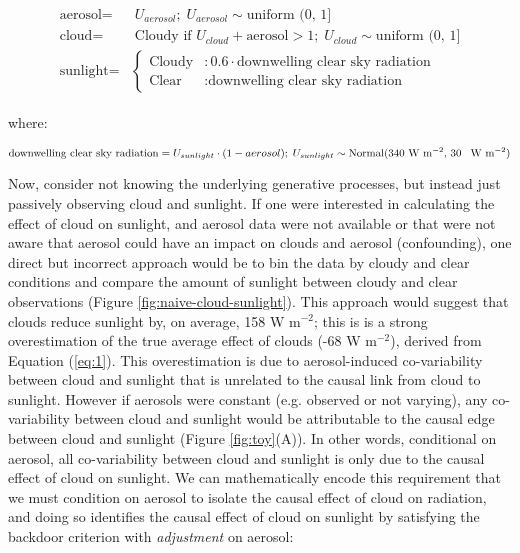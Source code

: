 \documentclass[12pt]{article}
\begin{document}
\begin{align}
  \begin{split}
    \text{aerosol} =& \; U_{aerosol}; \; U_{aerosol} \sim
    \text{uniform (0, 1]}\\ \text{cloud} =& \; \text{Cloudy if } U_{cloud} +
    \text{aerosol} > 1; \; U_{cloud} \sim \text{uniform (0, 1]}\\ \text{sunlight}
    =& \begin{cases} \text{Cloudy} &: 0.6 \cdot \text{downwelling clear
        sky radiation} \\ \text{Clear} &: \text{downwelling clear sky
        radiation}
    \end{cases}
    \label{eq:1}
  \end{split}
\end{align}

where:

\begin{equation*} \text{downwelling clear sky radiation} =
  U_{sunlight} \cdot (1 - aerosol); \; U_{sunlight} \sim
  \text{Normal(340 W m$^{-2}$, 30 \, W m$^{-2}$)}
\end{equation*}

Now, consider not knowing the underlying generative processes, but
instead just passively observing cloud and sunlight. If one were
interested in calculating the effect of cloud on sunlight, and aerosol
data were not available or that were not aware that aerosol could have an impact on clouds and aerosol (confounding), one direct but incorrect approach would be to bin the data
by cloudy and clear conditions and compare the amount of sunlight
between cloudy and clear observations (Figure
\ref{fig:naive-cloud-sunlight}). This approach would suggest that
clouds reduce sunlight by, on average, 158 W m$^{-2}$; this is is a
strong overestimation of the true average effect of clouds (-68 W
m$^{-2}$), derived from Equation (\ref{eq:1}). This overestimation is
due to aerosol-induced co-variability between cloud and sunlight that
is unrelated to the causal link from cloud to sunlight. However if
aerosols were constant (e.g. observed or not varying), any
co-variability between cloud and sunlight would be attributable to the
causal edge between cloud and sunlight (Figure \ref{fig:toy}(A)). In
other words, conditional on aerosol, all co-variability between cloud
and sunlight is only due to the causal effect of cloud on sunlight.
We can mathematically encode this requirement that we must condition
on aerosol to isolate the causal effect of cloud on radiation, and
doing so identifies the causal effect of cloud on sunlight by
satisfying the backdoor criterion with \textit{adjustment} on aerosol:
\end{document}
